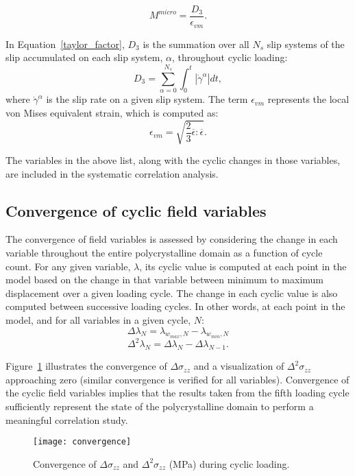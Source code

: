 \begin{equation}
\label{taylor_factor}
M^{micro} = \frac{D_3}{\epsilon_{vm}}.
\end{equation}

In Equation~\ref{taylor_factor}, $D_3$ is the summation over all $N_s$ slip systems of the slip accumulated on each slip system, $\alpha$, throughout cyclic loading:
\begin{equation}\label{D3}
D_3 = \sum_{\alpha=0}^{N_s}{\int_0^t {|\dot{\gamma}^{\alpha}|}dt},
\end{equation}
where $\dot{\gamma}^{\alpha}$ is the slip rate on a given slip system. The term $\epsilon_{vm}$ represents the local von Mises equivalent strain, which is computed as:
\begin{equation}\label{vonmises}
\epsilon_{vm} = \sqrt{\frac{2}{3} \overline{\epsilon} : \overline{\epsilon}}.
\end{equation}

The variables in the above list, along with the cyclic changes in those variables, are included in the systematic correlation analysis.

\subsection{Convergence of cyclic field variables}\label{convergence}
The convergence of field variables is assessed by considering the change in each variable throughout the entire polycrystalline domain as a function of cycle count. For any given variable, $\lambda$, its cyclic value is computed at each point in the model based on the change in that variable between minimum to maximum displacement over a given loading cycle. The change in each cyclic value is also computed between successive loading cycles. In other words, at each point in the model, and for all variables in a given cycle, $N$:
\begin{equation}\label{deltas}
\Delta \lambda_N = \lambda_{w_{max}, N} - \lambda_{w_{min}, N}\end{equation}
\begin{equation} \Delta^2 \lambda_N = \Delta \lambda_N - \Delta \lambda_{N-1}. \end{equation}

Figure~\ref{fig:convergence} illustrates the convergence of $\Delta \sigma_{zz}$ and a visualization of $\Delta ^2 \sigma_{zz}$ approaching zero (similar convergence is verified for all variables). Convergence of the cyclic field variables implies that the results taken from the fifth loading cycle sufficiently represent the state of the polycrystalline domain to perform a meaningful correlation study.
\begin{figure}[b]
  \centering
    \texttt{[image: convergence]}
    \caption{Convergence of $\Delta \sigma_{zz}$ and $\Delta ^2 \sigma_{zz}$ (MPa) during cyclic loading.}
    \label{fig:convergence}
\end{figure}
 
